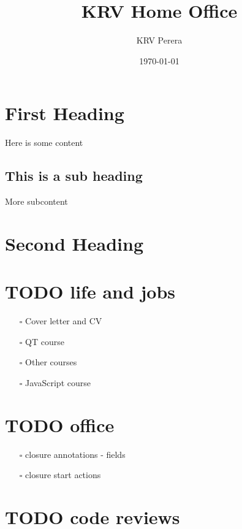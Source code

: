 \documentclass[11pt]{article}
\author{KRV Perera}
\date{\today}
\title{KRV Home Office}
\begin{document}
\maketitle
\tableofcontents

\section{First Heading}
\label{sec:orgfb291ca}
Here is some content

\subsection{This is a sub heading}
\label{sec:org48f559f}

More subcontent


\section{Second Heading}
\label{sec:org51b905e}


\section{{\bfseries\sffamily TODO} life and jobs}
\label{sec:org94a8baf}
\begin{itemize}
\item[{$\square$}] Cover letter and CV
\item[{$\square$}] QT course
\item[{$\square$}] Other courses
\item[{$\square$}] JavaScript course
\end{itemize}


\section{{\bfseries\sffamily TODO} office}
\label{sec:orgb7240f0}
\begin{itemize}
\item[{$\square$}] closure annotations - fields
\item[{$\square$}] closure start actions
\end{itemize}

\section{{\bfseries\sffamily TODO} code reviews}
\label{sec:org2f63c44}
\end{document}
